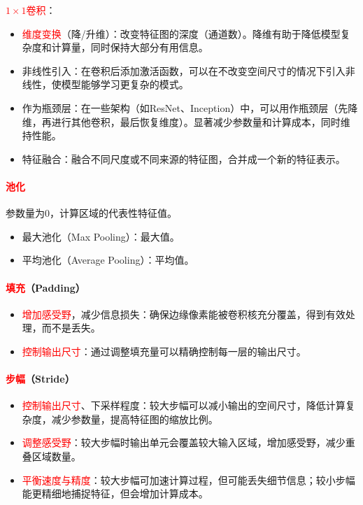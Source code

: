 \documentclass[
12pt, %
a4paper, 
oneside, %
]{scrartcl}
\begin{document}
\textcolor{red}{$ 1 \times 1 $卷积}：
\begin{itemize}
\item \textcolor{red}{维度变换}（降/升维）：改变特征图的深度（通道数）。降维有助于降低模型复杂度和计算量，同时保持大部分有用信息。
\item 非线性引入：在卷积后添加激活函数，可以在不改变空间尺寸的情况下引入非线性，使模型能够学习更复杂的模式。
\item 作为瓶颈层：在一些架构（如ResNet、Inception）中，可以用作瓶颈层（先降维，再进行其他卷积，最后恢复维度）。显著减少参数量和计算成本，同时维持性能。
\item 特征融合：融合不同尺度或不同来源的特征图，合并成一个新的特征表示。
\end{itemize}
\paragraph{\textcolor{red}{池化}}
参数量为$ 0 $，计算区域的代表性特征值。
\begin{itemize}
\item 最大池化（Max Pooling）：最大值。
\item 平均池化（Average Pooling）：平均值。
\end{itemize}
\paragraph{\textcolor{red}{填充}（Padding）}
\begin{itemize}
\item \textcolor{red}{增加感受野}，减少信息损失：确保边缘像素能被卷积核充分覆盖，得到有效处理，而不是丢失。
\item \textcolor{red}{控制输出尺寸}：通过调整填充量可以精确控制每一层的输出尺寸。
\end{itemize}
\paragraph{\textcolor{red}{步幅}（Stride）}
\begin{itemize}
\item \textcolor{red}{控制输出尺寸}、下采样程度：较大步幅可以减小输出的空间尺寸，降低计算复杂度，减少参数量，提高特征图的缩放比例。
\item \textcolor{red}{调整感受野}：较大步幅时输出单元会覆盖较大输入区域，增加感受野，减少重叠区域数量。
\item \textcolor{red}{平衡速度与精度}：较大步幅可加速计算过程，但可能丢失细节信息；较小步幅能更精细地捕捉特征，但会增加计算成本。
\end{itemize}
\end{document}
